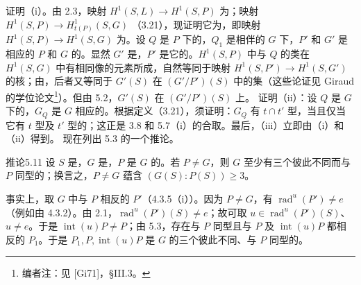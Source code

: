 证明（i）。由 2.3，映射 $H^1(S,L)\to H^1(S,P)$ 为；映射 $H^1(S,P)\to H^1_{t(P)}(S,G)$ （3.21），现证明它为，即映射 $H^1(S,P)\to H^1(S,G)$ 为。设 $Q$ 是 $P$ 下的，$Q_1$ 是相伴的 $G$ 下，$P'$ 和 $G'$ 是相应的 $P$ 和 $G$ 的。显然 $G'$ 是，$P'$ 是它的。$H^1(S,P)$ 中与 $Q$ 的类在 $H^1(S,G)$ 中有相同像的元素所成，自然等同于映射 $H^1(S,P')\to H^1(S,G')$ 的核；由，后者又等同于
$G'(S)$ 在 $(G'/P')(S)$ 中的集（这些论证见 Giraud 的学位论文\footnote{编者注：见 [Gi71]，\S III.3。}）。但由 5.2，$G'(S)$ 在 $(G'/P')(S)$ 上。
证明（ii）：设 $Q$ 是 $G$ 下的，$G_Q$ 是 $G$ 相应的。根据定义（3.21），须证明：$G_Q$ 有 $t\cap t'$ 型，当且仅当它有 $t$ 型及 $t'$ 型的；这正是 3.8 和 5.7（i）的合取。最后，（iii）立即由（i）和（ii）得到。
现在列出 5.3 的一个推论。
\begin{SGAresult}{推论}{5.11}
设 $S$ 是，$G$ 是，$P$ 是 $G$ 的。若 $P\neq G$，则 $G$ 至少有三个彼此不同而与 $P$ 同型的；换言之，$P\neq G$ 蕴含 $(G(S):P(S))\geq3$。
\end{SGAresult}
事实上，取 $G$ 中与 $P$ 相反的 $P'$（4.3.5（i））。因为 $P\neq G$，有 $\operatorname{rad}^{u}(P')\neq e$（例如由 4.3.2）。由 2.1，$\operatorname{rad}^{u}(P')(S)\neq e$；故可取 $u\in\operatorname{rad}^{u}(P')(S)$、$u\neq e$。于是 $\operatorname{int}(u)P\neq P$；由 5.3，存在与 $P$ 同型且与 $P$ 及 $\operatorname{int}(u)P$ 都相反的 $P_1$。于是 $P_1,P,\operatorname{int}(u)P$ 是 $G$ 的三个彼此不同、与 $P$ 同型的。


